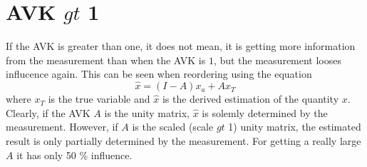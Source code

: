 \documentclass[a4paper]{article}
\begin{document}
\section{AVK $gt$ 1}

If the AVK is greater than one, it does not mean, it is getting more
information from the measurement than when the AVK is $1$, but the
measurement looses influcence again. This can be seen when reordering using the equation
\begin{equation}
  \hat{x} = (I - A) x_a + A x_T
\end{equation}
where $x_T$ is the true variable and $\hat{x}$ is the derived
estimation of the quantity $x$. Clearly, if the AVK $A$ is the unity
matrix, $\hat{x}$ is solemly determined by the measurement. However,
if $A$ is the scaled (scale
$gt$ 1) unity matrix, the estimated result is only partially
determined by the measurement. For getting a really large $A$ it has
only 50 \% influence.
\end{document}
